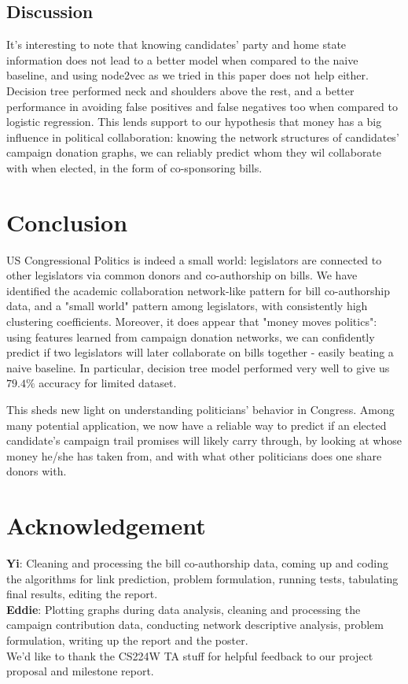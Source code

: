\documentclass[12pt,twocolumn]{article}
\begin{document}
\subsection{Discussion}
It's interesting to note that knowing candidates' party and home state information does not lead to a better model when compared to the naive baseline, and using node2vec as we tried in this paper does not help either. Decision tree performed neck and shoulders above the rest, and a better performance in avoiding false positives and false negatives too when compared to logistic regression. This lends support to our hypothesis that money has a big influence in political collaboration: knowing the network structures of candidates' campaign donation graphs, we can reliably predict whom they wil collaborate with when elected, in the form of co-sponsoring bills. 
\section{Conclusion}
US Congressional Politics is indeed a small world: legislators are connected to other legislators via common donors and co-authorship on bills. We have identified the academic collaboration network-like pattern for bill co-authorship data, and a "small world" pattern among legislators, with consistently high clustering coefficients. Moreover, it does appear that "money moves politics": using features learned from campaign donation networks, we can confidently predict if two legislators will later collaborate on bills together - easily beating a naive baseline. In particular, decision tree model performed very well to give us $79.4\%$ accuracy for limited dataset. 

This sheds new light on understanding politicians' behavior in Congress. Among many potential application, we now have a reliable way to predict if an elected candidate's campaign trail promises will likely carry through, by looking at whose money he/she has taken from, and with what other politicians does one share donors with. 

\section{Acknowledgement}
\textbf{Yi}: Cleaning and processing the bill co-authorship data, coming up and coding the algorithms for link prediction, problem formulation, running tests, tabulating final results, editing the report. \\
\textbf{Eddie}: Plotting graphs during data analysis, cleaning and processing the campaign contribution data, conducting network descriptive analysis, problem formulation, writing up the report and the poster. \\
We'd like to thank the CS224W TA stuff for helpful feedback to our project proposal and milestone report. 
\end{document}
